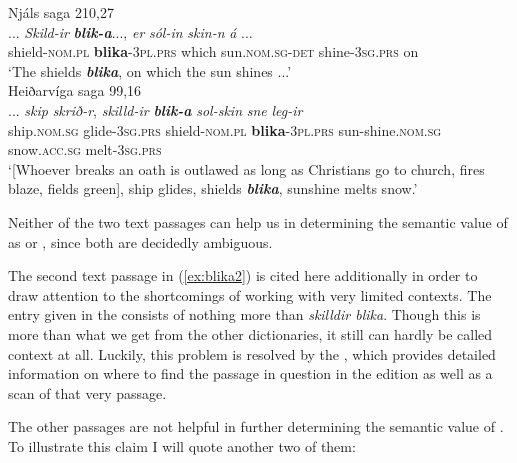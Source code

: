 \documentclass[output=paper,colorlinks,citecolor=brown]{langscibook}
\begin{document}
\begin{exe}
    \ex Njáls saga 210,27 \label{ex:blika1}\\
    \gll ... \textit{Skild-ir} {\textit{\textbf{blik-a}}...,} \textit{er} \textit{sól-in} \textit{skin-n} {\textit{á} ...}\\
      {} shield-\textsc{nom.pl} \textbf{blika}-\textsc{3pl.prs} which sun.\textsc{nom.sg-det} shine-\textsc{3sg.prs} on \\
    \glt ‘The shields \textbf{\textit{blika}}, on which the sun shines ...’\\
    
    \ex Heiðarvíga saga 99,16 \label{ex:blika2}\\
    \gll ... \textit{skip} \textit{skrið-r}, \textit{skilld-ir} {\textit{\textbf{blik-a}}} \textit{sol-skin} \textit{sne} \textit{leg-ir} \\
     {}  ship.\textsc{nom.sg} glide-\textsc{3sg.prs} shield-\textsc{nom.pl} \textbf{blika}-\textsc{3pl.prs} sun-shine.\textsc{nom.sg} snow.\textsc{acc.sg} melt-\textsc{3sg.prs}\\
    \glt ‘[Whoever breaks an oath is outlawed as long as Christians go to church, fires blaze, fields green], ship glides, shields \textbf{\textit{blika}}, sunshine melts snow.’
\end{exe}

Neither of the two text passages can help us in determining the semantic value of  as  or , since both are decidedly ambiguous. 

The second text passage in (\ref{ex:blika2}) is cited here additionally in order to draw attention to the shortcomings of working with very limited contexts. The entry given in the  consists of nothing more than \textit{skilldir blika}. Though this is more than what we get from the other dictionaries, it still can hardly be called context at all. Luckily, this problem is resolved by the , which provides detailed information on where to find the passage in question in the edition as well as a scan of that very passage.

The other passages are not helpful in further determining the semantic value of . To illustrate this claim I will quote another two of them:
 
\end{document}
